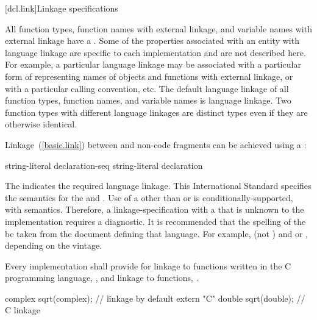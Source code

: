[dcl.link]{Linkage specifications}%

\pnum
All function types, function names with external linkage, and variable
names with external linkage have a .
\enternote
Some of the properties associated with an entity with language linkage
are specific to each implementation and are not described here. For
example, a particular language linkage may be associated with a
particular form of representing names of objects and functions with
external linkage, or with a particular calling convention, etc.
\exitnote
The default language linkage of all function types, function names, and
variable names is \Cpp language linkage. Two function types with
different language linkages are distinct types even if they are
otherwise identical.

\pnum
Linkage~(\ref{basic.link}) between \Cpp and  non-\Cpp code fragments can
be achieved using a :

%
%
%
\begin{bnf}
\br
     string-literal \terminal{\{} declaration-seq\opt \terminal{\}}\br
     string-literal declaration
\end{bnf}

The  indicates the required language linkage.
This International Standard specifies the semantics for the
  and . Use of a
 other than  or  is
conditionally-supported, with  semantics.
\enternote
Therefore, a linkage-specification with a  that
is unknown to the implementation requires a diagnostic.
\exitnote
\enternote
It is recommended that the spelling of the  be
taken from the document defining that language. For example, 
(not ) and  or , depending on
the vintage.
\exitnote

\pnum
{}%
Every implementation shall provide for linkage to functions written in
the C programming language,
%
, and linkage to \Cpp functions, .
\enterexample

\begin{codeblock}
complex sqrt(complex);          // \Cpp linkage by default
extern "C" {
  double sqrt(double);          // C linkage
}
\end{codeblock}
\exitexample

